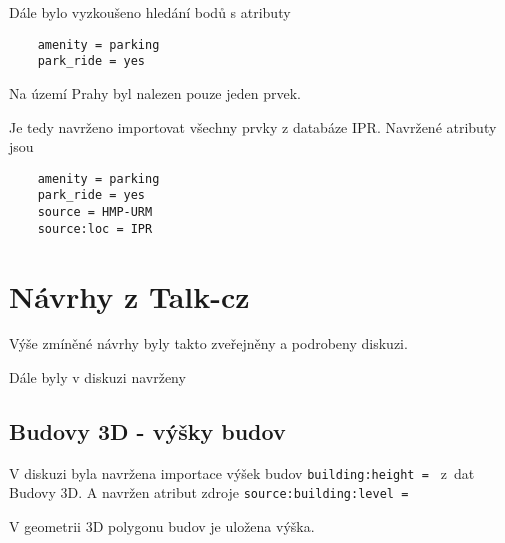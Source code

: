 Dále bylo vyzkoušeno hledání bodů s atributy 
\begin{verbatim}
    amenity = parking
    park_ride = yes
\end{verbatim}
Na území Prahy byl nalezen pouze jeden prvek.

Je tedy navrženo importovat všechny prvky z databáze IPR.
Navržené atributy jsou
\begin{verbatim}
    amenity = parking
    park_ride = yes
    source = HMP-URM
    source:loc = IPR
\end{verbatim}


\section{Návrhy z Talk-cz}
\label{Návrhy z Talk-cz}
Výše zmíněné návrhy byly takto zveřejněny a podrobeny diskuzi.

Dále byly v diskuzi navrženy

\subsection{Budovy 3D - výšky budov}
\label{Budovy 3D - výšky budov}
V diskuzi byla navržena importace výšek budov {\tt building:height~= }
z~dat Budovy 3D. A navržen atribut zdroje {\tt source:building:level~= }

V geometrii 3D polygonu budov je uložena výška.
